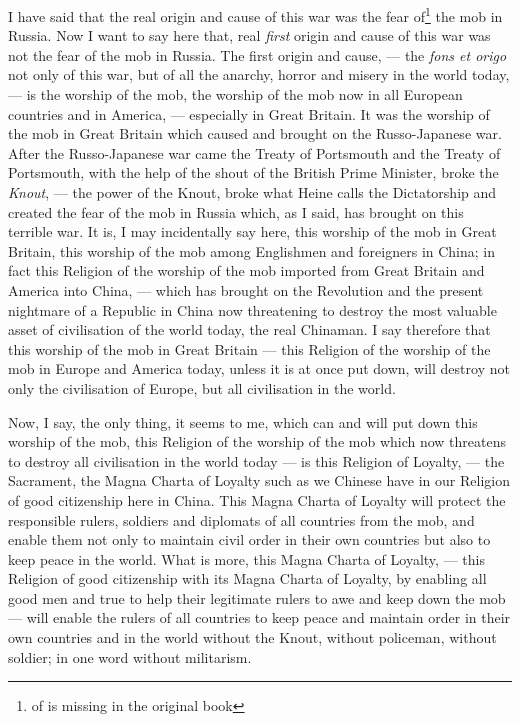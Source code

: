 I have said that the real origin and cause of this war was the fear of\footnote{of is missing in the original book} the mob in Russia.
Now I want to say here that, real \emph{first} origin and cause of this war was not the fear of the mob in Russia.
The first origin and cause, --- the \emph{fons et origo} not only of this war, but of all the anarchy, horror and misery in the world today, --- is the worship of the mob, the worship of the mob now in all European countries and in America, --- especially in Great Britain.
It was the worship of the mob in Great Britain which caused and brought on the Russo-Japanese war\cite{num29}.
After the Russo-Japanese war came the Treaty of Portsmouth and the Treaty of Portsmouth, with the help of the shout of the British Prime Minister, broke the \emph{Knout}, --- the power of the Knout, broke what Heine calls the Dictatorship and created the fear of the mob in Russia which, as I said, has brought on this terrible war.
It is, I may incidentally say here, this worship of the mob in Great Britain, this worship of the mob among Englishmen and foreigners in China; in fact this Religion of the worship of the mob imported from Great Britain and America into China, --- which has brought on the Revolution and the present nightmare of a Republic in China now threatening to destroy  the most valuable asset of civilisation of the world today, the real Chinaman. 
I say therefore that this worship of the mob in Great Britain --- this Religion of the worship of the mob in Europe and America today, unless it is at once put down, will destroy not only the civilisation of Europe, but all civilisation in the world.  

Now, I say, the only thing, it seems to me, which can and will put down this worship of the mob, this Religion of the worship of the mob which now threatens to destroy all civilisation in the world today --- is this Religion of Loyalty, --- the Sacrament, the Magna Charta of Loyalty such as we Chinese have in our Religion of good citizenship here in China.
This Magna Charta of Loyalty will protect the responsible rulers, soldiers and diplomats of all countries from the mob, and enable them not only to maintain civil order in their own countries but also to keep peace in the world.
What is more, this Magna Charta of Loyalty, --- this Religion of good citizenship with its Magna Charta of Loyalty, by enabling all good men and true to help their legitimate rulers to awe and keep down the mob --- will enable the rulers of all countries to keep peace and maintain order in their own countries and in the world without the Knout, without policeman, without soldier; in one word without militarism.


